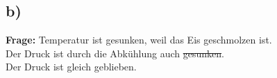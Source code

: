 

\subsection*{b)}
\textbf{Frage:} Temperatur ist gesunken, weil das Eis geschmolzen ist. \\
Der Druck ist durch die Abkühlung auch \sout{gesunken}. \\
Der Druck ist gleich geblieben.